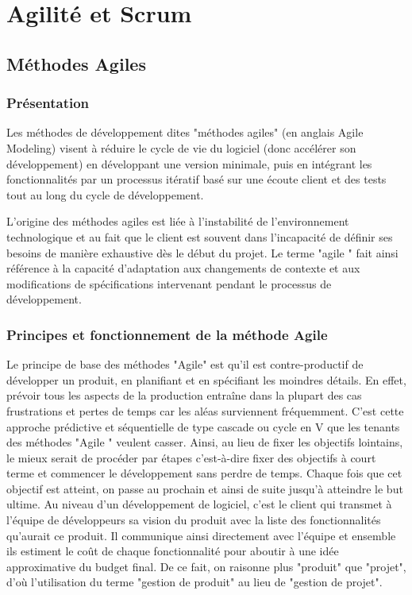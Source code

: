 \chapter{Agilité et Scrum}

\section{Méthodes Agiles}

\subsection{Présentation}
Les méthodes de développement dites "méthodes agiles" (en anglais Agile Modeling) visent à réduire le cycle de vie du logiciel (donc accélérer son développement) en développant une version minimale, puis en intégrant les fonctionnalités par un processus itératif basé sur une écoute client et des tests tout au long du cycle de développement. 

L'origine des méthodes agiles est liée à l'instabilité de l'environnement technologique et au fait que le client est souvent dans l'incapacité de définir ses besoins de manière exhaustive dès le début du projet. Le terme "agile " fait ainsi référence à la capacité d'adaptation aux changements de contexte et aux modifications de spécifications intervenant pendant le processus de développement. 

\subsection{Principes et fonctionnement de la méthode Agile}

Le principe de base des méthodes "Agile" est qu’il est contre-productif de développer un produit, en planifiant et en spécifiant les moindres détails. 
En effet, prévoir tous les aspects de la production entraîne dans la plupart des cas frustrations et pertes de temps car les aléas surviennent fréquemment. C’est cette approche prédictive et séquentielle de type cascade ou cycle en V que les tenants des méthodes "Agile " veulent casser. Ainsi, au lieu de fixer les objectifs lointains, le mieux serait de procéder par étapes c’est-à-dire fixer des objectifs à court terme et commencer le développement sans perdre de temps. Chaque fois que cet objectif est atteint, on passe au prochain et ainsi de suite jusqu’à atteindre le but ultime. Au niveau d’un développement de logiciel, c’est le client qui transmet à l’équipe de développeurs sa vision du produit avec la liste des fonctionnalités qu’aurait ce produit. Il communique ainsi directement avec l’équipe et ensemble ils estiment le coût de chaque fonctionnalité pour aboutir à une idée approximative du budget final. De ce fait, on raisonne plus "produit" que "projet", d’où l’utilisation du terme "gestion de produit" au lieu de "gestion de projet".

